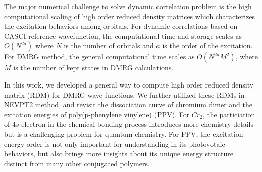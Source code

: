 The major numerical challenge to solve dynamic correlation problem is the high computational scaling of high order reduced density matrices which 
characterizes the excitation behaviors among orbitals. For dynamic correlations based on CASCI reference wavefunction, the computational time and storage 
scales as $O(N^{2a})$ where $N$ is the number of orbitals and $a$ is the order of the excitation. For DMRG method, the general computational time scales 
as $O(N^{2a} M^{2})$, where $M$ is the number of kept states in DMRG calculations. 

In this work, we developed a general way to compute high order reduced density matrix (RDM) for DMRG wave functions. We further utilized 
these RDMs in NEVPT2 method\cite{angeli_introduction_2001, angeli_n-electron_2001, angeli_n-electron_2002}, and revisit the dissociation 
curve of chromium dimer and the exitation energies of poly(p-phenylene vinylene) (PPV). For $Cr_{2}$, the particiation of $4s$ electron in 
the chemical bonding process introduces more chemistry details but is a challenging problem for quantum chemistry. For PPV, the excitation energy 
order is not only important for understanding in its photovotaic behaviors, but also brings more insights about its unique energy structure 
distinct from many other conjugated polymers.




